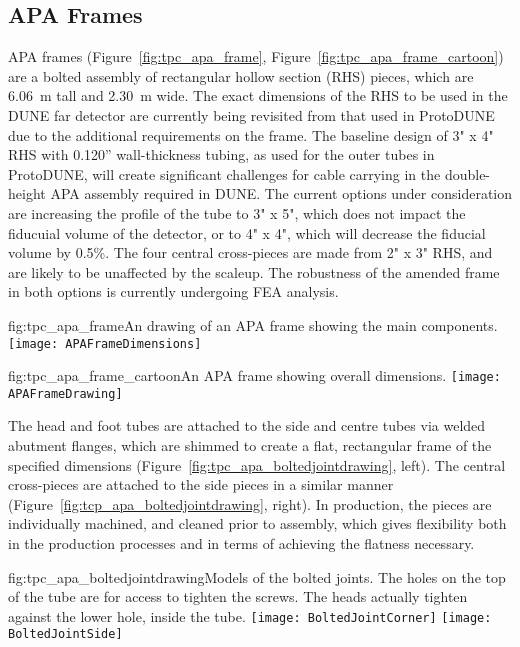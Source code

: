 \subsection{APA Frames}
\label{sec:fdsp-apa-frames}

APA frames (Figure~\ref{fig:tpc_apa_frame}, Figure~\ref{fig:tpc_apa_frame_cartoon}) are a bolted assembly of rectangular hollow section (RHS) pieces, which are \SI{6.06}{m} tall and \SI{2.30}{m} wide.  The exact dimensions of the RHS to be used in the DUNE far detector are currently being revisited from that used in ProtoDUNE due to the additional requirements on the frame.  The baseline design of 3" x 4" RHS with 0.120” wall-thickness tubing, as used for the outer tubes in ProtoDUNE, will create significant challenges for cable carrying in the double-height APA assembly required in DUNE.  The current options under consideration are increasing the profile of the tube to 3" x 5", which does not impact the fiducuial volume of the detector, or to 4" x 4", which will decrease the fiducial volume by 0.5\%.  The four central cross-pieces are made from 2" x 3" RHS, and are likely to be unaffected by the scaleup. The robustness of the amended frame in both options is currently undergoing FEA analysis.  

\begin{dunefigure}{fig:tpc_apa_frame}{An drawing of an APA frame showing the main components. }
\texttt{[image: APAFrameDimensions]} 
\end{dunefigure}

\begin{dunefigure}{fig:tpc_apa_frame_cartoon}{An APA frame showing overall dimensions.}
\texttt{[image: APAFrameDrawing]} 
\end{dunefigure}


The head and foot tubes are attached to the side and centre tubes via welded abutment flanges, which are shimmed to create a flat, rectangular frame of the specified dimensions (Figure~\ref{fig:tpc_apa_boltedjointdrawing}, left).  The central cross-pieces are attached to the side pieces in a similar manner (Figure~\ref{fig:tcp_apa_boltedjointdrawing}, right).  In production, the pieces are individually machined, and cleaned prior to assembly, which gives flexibility both in the production processes and in terms of achieving the flatness necessary.  

\begin{dunefigure}{fig:tpc_apa_boltedjointdrawing}{Models of the bolted joints. The holes on the top of the tube are for access to tighten the screws. The heads actually tighten against the lower hole, inside the tube.}
\texttt{[image: BoltedJointCorner]} 
\texttt{[image: BoltedJointSide]} 
\end{dunefigure}

